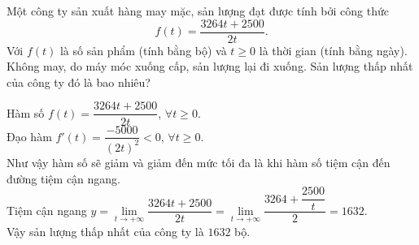 \begin{ex}%
	Một công ty sản xuất hàng may mặc, sản lượng đạt được tính bởi công thức $$f(t)=\dfrac{3264t + 2500}{2t}.$$
	Với $f(t)$ là số sản phẩm (tính bằng bộ) và $t\ge 0$ là thời gian (tính bằng ngày).
	Không may, do máy móc xuống cấp, sản lượng lại đi xuống. Sản lượng thấp nhất của công ty đó là bao nhiêu?
	
	\loigiai
	{
		Hàm số $f(t) = \dfrac{3264t + 2500}{2t}$, $\forall t \ge 0$.\\
		Đạo hàm $f'(t) = \dfrac{-5000}{(2t)^2}<0$, $\forall t \ge 0$.\\
		Như vậy hàm số sẽ giảm và giảm đến mức tối đa là khi hàm số tiệm cận đến đường tiệm cận ngang.\\
		Tiệm cận ngang $y=\lim\limits_{t \to +\infty} \dfrac{3264t + 2500}{2t} =\lim\limits_{t \to +\infty} \dfrac{3264 + \dfrac{2500}{t}}{2} = 1632$.\\
		Vậy sản lượng thấp nhất của công ty là $1632$ bộ.
	}
\end{ex}

